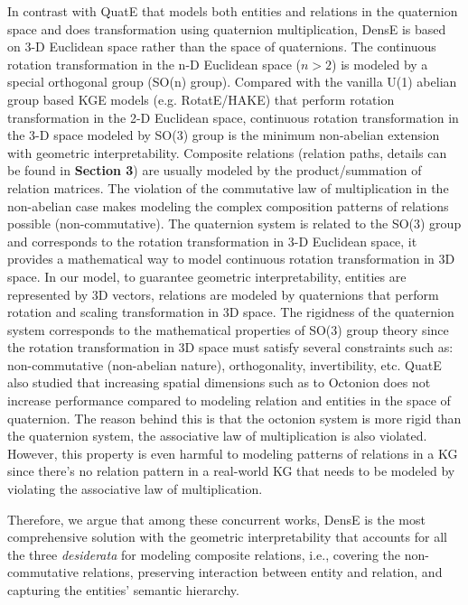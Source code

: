 \documentclass[11pt]{article}
\begin{document}
In contrast with QuatE that models both entities and relations in the quaternion space and does transformation using quaternion multiplication, DensE is based on 3-D Euclidean space rather than the space of quaternions. The continuous rotation transformation in the n-D Euclidean space (\(n > 2\)) is modeled by a special orthogonal group (SO(n) group). 
Compared with the vanilla U(1) abelian group based KGE models (e.g. RotatE/HAKE) that perform rotation transformation in the 2-D Euclidean space, continuous rotation transformation in the 3-D space modeled by SO(3) group is the minimum non-abelian extension with geometric interpretability. 
Composite relations (relation paths, details can be found in \textbf{Section 3}) are usually modeled by the product/summation of relation matrices. The violation of the commutative law of multiplication in the non-abelian case makes modeling the complex composition patterns of relations possible (non-commutative). 
The quaternion system is related to the SO(3) group and corresponds to the rotation transformation in 3-D Euclidean space, it provides a mathematical way to model continuous rotation transformation in 3D space. In our model, to guarantee geometric interpretability, entities are represented by 3D vectors, relations are modeled by quaternions that perform rotation and scaling transformation in 3D space. 
The rigidness of the quaternion system corresponds to the mathematical properties of SO(3) group theory since the rotation transformation in 3D space must satisfy several constraints such as: non-commutative (non-abelian nature), orthogonality, invertibility, etc. 
QuatE also studied that increasing spatial dimensions such as to Octonion does not increase performance compared to modeling relation and entities in the space of quaternion. The reason behind this is that the octonion system is more rigid than the quaternion system, the associative law of multiplication is also violated. However, this property is even harmful to modeling patterns of relations in a KG since there’s no relation pattern in a real-world KG that needs to be modeled by violating the associative law of multiplication.

Therefore, we argue that among these concurrent works, DensE is the most comprehensive solution with the geometric interpretability that accounts for all the three \textit{desiderata} for modeling composite relations, i.e., covering the non-commutative relations, preserving interaction between entity and relation, and capturing the entities' semantic hierarchy.
\end{document}
